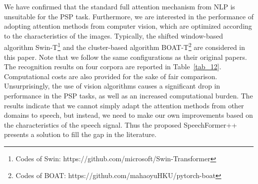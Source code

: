 \documentclass[lettersize,journal]{IEEEtran}
\begin{document}
\begin{table}[!t]
    \caption{Performances of adopting attention mechanisms from computer vision on four corpora. Window-based Swin and cluster-based BOAT algorithms are considered}
    \label{tab_12}
    \centering
\end{table}

We have confirmed that the standard full attention mechanism from NLP is unsuitable for the PSP task. Furthermore, we are interested in the performance of adopting attention methods from computer vision, which are optimized according to the characteristics of the images. Typically, the shifted window-based algorithm Swin-T\footnote{Codes of Swin: https://github.com/microsoft/Swin-Transformer} \cite{Swin} and the cluster-based algorithm BOAT-T\footnote{Codes of BOAT: https://github.com/mahaoyuHKU/pytorch-boat} \cite{cluster_vit} are considered in this paper. Note that we follow the same configurations as their original papers. The recognition results on four corpora are reported in Table~\ref{tab_12}. Computational costs are also provided for the sake of fair comparison. Unsurprisingly, the use of vision algorithms causes a significant drop in performance in the PSP tasks, as well as an increased computational burden. The results indicate that we cannot simply adapt the attention methods from other domains to speech, but instead, we need to make our own improvements based on the characteristics of the speech signal. Thus the proposed SpeechFormer++ presents a solution to fill the gap in the literature.
\end{document}
